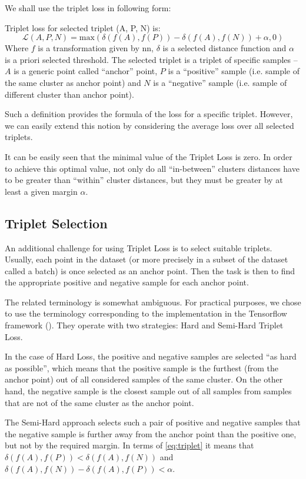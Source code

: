 We shall use the triplet loss in following form:
\begin{defn}
Triplet loss for selected triplet (A, P, N) is:
\begin{equation}
\mathcal{L}(A, P, N) = \text{max}(\delta(f(A), f(P)) - \delta(f(A), f(N)) + \alpha, 0)
\label{eq:triplet}
\end{equation}
Where $f$ is a transformation given by \gls{nn}, $\delta$
is a selected distance function and $\alpha$ is a priori selected threshold. The
selected triplet is a triplet of specific samples -- $A$ is a generic point
called ``anchor'' point, $P$ is a ``positive'' sample (i.e. sample of the same
cluster as anchor point) and $N$ is a ``negative'' sample (i.e. sample of
different cluster than anchor point).
\end{defn}


Such a definition provides the formula of the loss for a specific triplet. However, we can easily extend this notion by considering the average loss over all selected triplets.

It can be easily seen that the minimal value of the Triplet Loss is zero. In order to achieve this optimal value, not only do all ``in-between'' clusters distances have to be greater than ``within'' cluster distances, but they must be greater by at least a given margin $\alpha$.

\subsection{Triplet Selection}

An additional challenge for using Triplet Loss is to select suitable triplets. Usually, each point in the dataset (or more precisely in a subset of the dataset called a batch) is once selected as an anchor point. Then the task is then to find the appropriate positive and negative sample for each anchor point.

The related terminology is somewhat ambiguous. For practical purposes, we chose to use the terminology corresponding to the implementation in the Tensorflow framework (\cite{tensorflow}). They operate with two strategies: Hard and Semi-Hard Triplet Loss.

In the case of Hard Loss, the positive and negative samples are selected ``as hard as possible'', which means that the positive sample is the furthest (from the anchor point) out of all considered samples of the same cluster. On the other hand, the negative sample is the closest sample out of all samples from samples that are not of the same cluster as the anchor point.

The Semi-Hard approach selects such a pair of positive and negative samples that the negative sample is further away from the anchor point than the positive one, but not by the required margin. In terms of \autoref{eq:triplet} it means that $\delta(f(A), f(P)) < \delta(f(A), f(N))$ and $\delta(f(A), f(N)) - \delta(f(A), f(P)) < \alpha$.